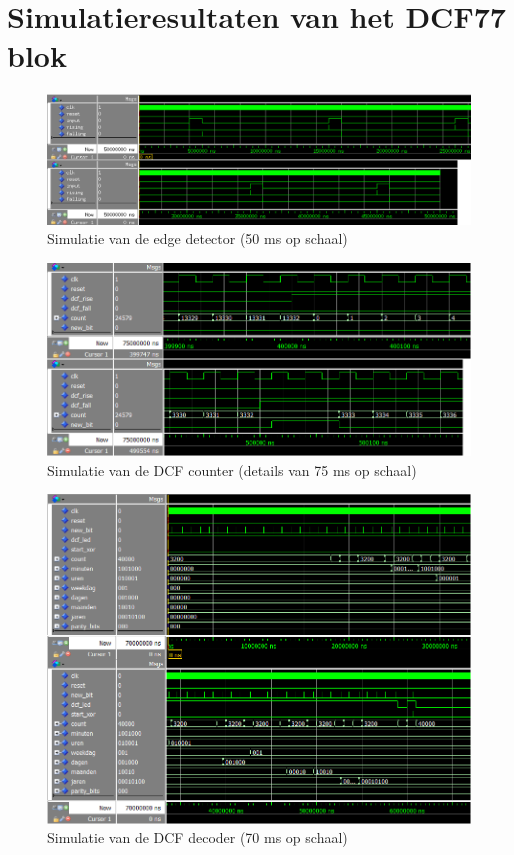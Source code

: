 \chapter[Simulatie resultaten DCF]{Simulatieresultaten van het DCF77 blok}
\label{Ap: dcf_sim}
\begin{figure}[ht!]
\includegraphics[width=\textwidth,height=\textheight,keepaspectratio]{Figuren/DCF77/Edge_detector.png}
\caption{Simulatie van de edge detector (50 ms op schaal)}
\end{figure}
\begin{figure}[ht!]
\includegraphics[width=\textwidth,height=\textheight,keepaspectratio]{Figuren/DCF77/Counter.png}
\caption{Simulatie van de DCF counter (details van 75 ms op schaal)}
\end{figure}
\begin{figure}[ht!]
\includegraphics[width=\textwidth,height=\textheight,keepaspectratio]{Figuren/DCF77/Decoder.png}
\caption{Simulatie van de DCF decoder (70 ms op schaal)}
\end{figure}
